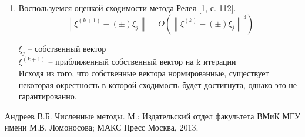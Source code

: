 \documentclass[12pt]{article}
\begin{document}
\begin{enumerate}
\item Воспользуемся оценкой сходимости метода Релея [1, с. 112].
$$\left\|\xi^{(k+1)}-(\pm) \xi_{j}\right\|=O\left(\left\|\xi^{(k)}-(\pm) \xi_{j}\right\|^{3}\right)$$

$\xi_{j}$ -- собственный вектор\\
$\xi^{(k+1)}$ -- приближенный собственный вектор на k итерации\\

Исходя из того, что собственные вектора нормированные, существует некоторая окрестность в которой сходимость будет достигнута, однако это не гарантированно.	

\end{enumerate}

\begin{thebibliography}{3}
	Андреев В.Б. Численные методы. М.: Издательский отдел факультета ВМиК МГУ имени М.В. Ломоносова; МАКС Пресс Москва, 2013.
\end{thebibliography}
\end{document}

